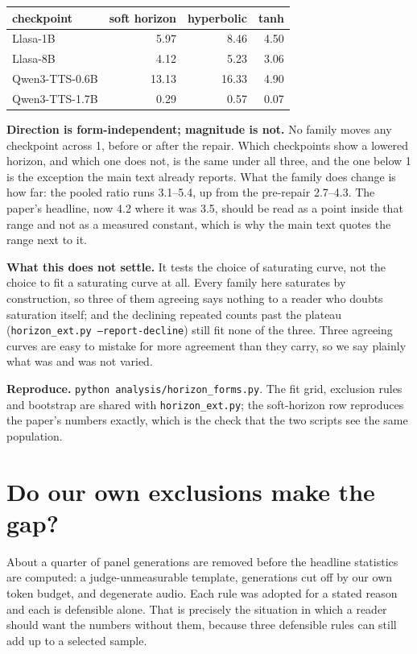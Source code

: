 \documentclass[11pt]{article}
\begin{document}
\begin{center}
\begin{tabular}{lrrr}
\toprule
checkpoint & soft horizon & hyperbolic & tanh \\
\midrule
Llasa-1B        &  5.97 &  8.46 & 4.50 \\
Llasa-8B        &  4.12 &  5.23 & 3.06 \\
Qwen3-TTS-0.6B  & 13.13 & 16.33 & 4.90 \\
Qwen3-TTS-1.7B  &  0.29 &  0.57 & 0.07 \\
\bottomrule
\end{tabular}
\end{center}

\noindent \textbf{Direction is form-independent; magnitude is not.} No family
moves any checkpoint across 1, before or after the repair. Which checkpoints show
a lowered horizon, and which one does not, is the same under all three, and the
one below 1 is the exception the main text already reports. What the family does change is
how far: the pooled ratio runs 3.1--5.4, up from the pre-repair 2.7--4.3. The
paper's headline, now 4.2 where it was 3.5, should be read as a point inside that
range and not as a measured constant, which is why the main text quotes the range next to
it.

\noindent\textbf{What this does not settle.} It tests the choice of saturating
curve, not the choice to fit a saturating curve at all. Every family here
saturates by construction, so three of them agreeing says nothing to a reader who
doubts saturation itself; and the declining repeated counts past the plateau
(\texttt{horizon\_ext.py --report-decline}) still fit none of the three. Three
agreeing curves are easy to mistake for more agreement than they carry, so we say
plainly what was and was not varied.

\noindent\textbf{Reproduce.} \texttt{python analysis/horizon\_forms.py}. The fit
grid, exclusion rules and bootstrap are shared with \texttt{horizon\_ext.py}; the
soft-horizon row reproduces the paper's numbers exactly, which is the check that
the two scripts see the same population.


\section{Do our own exclusions make the gap?}

About a quarter of panel generations are removed before the headline statistics
are computed: a judge-unmeasurable template, generations cut off by our own token
budget, and degenerate audio. Each rule was adopted for a stated reason and each
is defensible alone. That is precisely the situation in which a reader should
want the numbers without them, because three defensible rules can still add up to
a selected sample.
\end{document}
